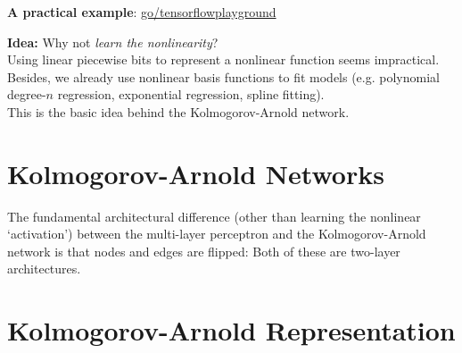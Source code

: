 \begin{frame}
    \textbf{A practical example}: \url{go/tensorflowplayground}
\end{frame}

\begin{frame}
    \textbf{Idea:} Why not \textit{learn the nonlinearity}? \\
    \vspace{5mm}
    Using linear piecewise bits to represent a nonlinear function seems impractical. Besides, we already
    use nonlinear basis functions to fit models (e.g. polynomial degree-$n$ regression, exponential
    regression, spline fitting). \\
    \vspace{5mm}
    This is the basic idea behind the Kolmogorov-Arnold network.
\end{frame}

\section{Kolmogorov-Arnold Networks}

\begin{frame}
    The fundamental architectural difference (other than learning the nonlinear
    `activation') between the multi-layer perceptron and the Kolmogorov-Arnold
    network is that nodes and edges are flipped:
    Both of these are two-layer architectures. 
\end{frame}

\section{Kolmogorov-Arnold Representation}

